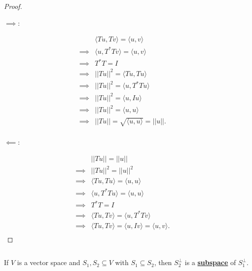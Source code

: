 \documentclass{article}
\newenvironment{customthm}[1]
  {\renewcommand\theinnercustomthm{#1}\innercustomthm}
  {\endinnercustomthm}
\begin{document}
\begin{proof}
  $ $

  \textbf{\underline{$\implies$}}:

  \begin{align*}
    & \langle
      Tu, Tv
    \rangle 
    =
    \langle
      u, v
    \rangle &&\\
    \implies & 
    \langle
    u, T^*Tv
    \rangle 
    =
    \langle
      u, v
    \rangle &&\\
    \implies & T^*T = I &&\\
    \implies & ||Tu||^2
    =
    \langle
      Tu, Tu
    \rangle &&\\
    \implies & ||Tu||^2
    =
    \langle
      u, T^*Tu
    \rangle &&\\
    \implies & ||Tu||^2
    =
    \langle
      u, Iu
    \rangle &&\\
    \implies & ||Tu||^2
    =
    \langle
      u, u
    \rangle &&\\
    \implies & ||Tu||
    =
    \sqrt{
    \langle
      u, u
    \rangle} = ||u||. &&\\
  \end{align*}

  \textbf{\underline{$\impliedby$}}:

  \begin{align*}
    & ||Tu||
    = ||u|| &&\\
    \implies & ||Tu||^2
    = ||u||^2 &&\\
    \implies & 
    \langle
      Tu, Tu
    \rangle
    =
    \langle
      u, u
    \rangle &&\\
    \implies & 
    \langle
      u, T^*Tu
    \rangle
    =
    \langle
      u, u
    \rangle &&\\
    \implies & T^*T = I &&\\
    \implies & \langle
      Tu, Tv
    \rangle
    =
    \langle
      u, T^*Tv
    \rangle &&\\
    \implies & \langle
      Tu, Tv
    \rangle
    =
    \langle
      u, Iv
    \rangle 
    =
    \langle
      u, v
    \rangle. &&\\
  \end{align*}

\end{proof}
\newpage


\begin{customthm}{12}[2022.S(1.A.i)]
  $ $

  If $V$ is a vector space and $S_1, S_2 \subseteq V$ with $S_1 \subseteq S_2$, then $S_2^\perp$ is a \textbf{\underline{subspace}} of $S_1^\perp$.
\end{customthm}
\end{document}
